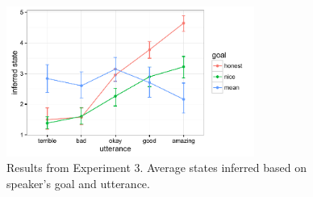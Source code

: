 \documentclass[10pt,letterpaper]{article}
\begin{document}
\begin{figure}
\begin{centering} 
\includegraphics[width=3.2in]{figures/exp3.pdf}
\caption{\label{fig:exp3} Results from Experiment 3. Average states inferred based on speaker's goal and utterance.}
\end{centering} 
\end{figure}




\setlength{\bibleftmargin}{.125in}
\setlength{\bibindent}{-\bibleftmargin}


\end{document}
